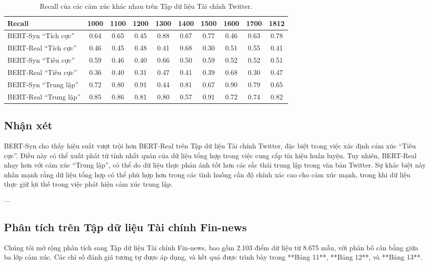 \documentclass[a4paper,10pt]{article}
\begin{document}
\begin{table}[h]
    \renewcommand{\thetable}{10}
    \centering
    \caption{Recall của các cảm xúc khác nhau trên Tập dữ liệu Tài chính Twitter.}
    \label{tab:recall_twitter}
    \begin{tabular}{lccccccccc}
        \hline
        Recall & 1000 & 1100 & 1200 & 1300 & 1400 & 1500 & 1600 & 1700 & 1812 \\
        \hline
        BERT-Syn “Tích cực”  & 0.64 & 0.65 & 0.45 & 0.88 & 0.67 & 0.77 & 0.46 & 0.63 & 0.78 \\
        BERT-Real “Tích cực” & 0.46 & 0.45 & 0.48 & 0.41 & 0.68 & 0.30 & 0.51 & 0.55 & 0.41 \\
        BERT-Syn “Tiêu cực”  & 0.59 & 0.46 & 0.40 & 0.66 & 0.50 & 0.59 & 0.52 & 0.52 & 0.51 \\
        BERT-Real “Tiêu cực” & 0.36 & 0.40 & 0.31 & 0.47 & 0.41 & 0.39 & 0.68 & 0.30 & 0.47 \\
        BERT-Syn “Trung lập” & 0.72 & 0.80 & 0.91 & 0.44 & 0.81 & 0.67 & 0.90 & 0.79 & 0.65 \\
        BERT-Real “Trung lập” & 0.85 & 0.86 & 0.81 & 0.80 & 0.57 & 0.91 & 0.72 & 0.74 & 0.82 \\
        \hline
    \end{tabular}
\end{table}


\subsection{Nhận xét} 

BERT-Syn cho thấy hiệu suất vượt trội hơn BERT-Real trên Tập dữ liệu Tài chính Twitter, đặc biệt trong việc xác định cảm xúc “Tiêu cực”. Điều này có thể xuất phát từ tính nhất quán của dữ liệu tổng hợp trong việc cung cấp tín hiệu huấn luyện. Tuy nhiên, BERT-Real nhạy hơn với cảm xúc “Trung lập”, có thể do dữ liệu thực phản ánh tốt hơn các sắc thái trung lập trong văn bản Twitter. Sự khác biệt này nhấn mạnh rằng dữ liệu tổng hợp có thể phù hợp hơn trong các tình huống cần độ chính xác cao cho cảm xúc mạnh, trong khi dữ liệu thực giữ lợi thế trong việc phát hiện cảm xúc trung lập.

---

\subsection{Phân tích trên Tập dữ liệu Tài chính Fin-news} 

Chúng tôi mở rộng phân tích sang Tập dữ liệu Tài chính Fin-news, bao gồm 2.103 điểm dữ liệu từ 8.675 mẫu, với phân bố cân bằng giữa ba lớp cảm xúc. Các chỉ số đánh giá tương tự được áp dụng, và kết quả được trình bày trong **Bảng 11**, **Bảng 12**, và **Bảng 13**.
\end{document}
